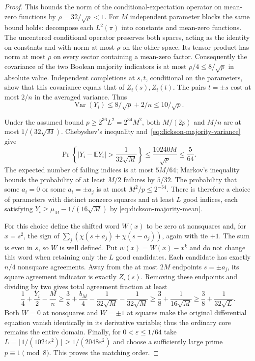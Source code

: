 \begin{proof}
This bounds the norm of the conditional-expectation operator on
mean-zero functions by $\rho=32/\sqrt p<1$.
For $M$ independent parameter blocks the same bound holds:
decompose each $L^2(\pi)$ into constants and mean-zero functions.
The uncentered conditional operator preserves both spaces, acting
as the identity on constants and with norm at most $\rho$ on the
other space.  Its tensor product has norm at most $\rho$ on every
sector containing a mean-zero factor.
Consequently the covariance of the two Boolean majority indicators
is at most $\rho/4\le8/\sqrt p$ in absolute value.
Independent completions at $s,t$, conditional on the parameters,
show that this covariance equals that of $Z_i(s),Z_i(t)$.
The pairs $t=\pm s$ cost at most $2/n$ in the averaged variance.
Thus
\begin{equation}\label{eq:dickson-majority-variance}
 \operatorname{Var}(Y_i)\le8/\sqrt p+2/n\le10/\sqrt p.
\end{equation}

Under the assumed bound $p\ge2^{36}L^2=2^{34}M^2$, both
$M/(2p)$ and $M/n$ are at most $1/(32\sqrt M)$.
Chebyshev's inequality and~\eqref{eq:dickson-majority-variance}
give
\[
 \Pr\left\{|Y_i-\mathbb E Y_i|>\frac1{32\sqrt M}\right\}
 \le\frac{10240M}{\sqrt p}\le\frac5{64}.
\]
The expected number of failing indices is at most $5M/64$;
Markov's inequality bounds the probability of at least $M/2$ failures
by $5/32$.  The probability that some $a_i=0$ or some
$a_i=\pm a_j$ is at most $M^2/p\le2^{-34}$.
There is therefore a choice of parameters with distinct nonzero
squares and at least $L$ good indices, each satisfying
$Y_i\ge\mu_M-1/(16\sqrt M)$ by
\eqref{eq:dickson-majority-mean}.

For this choice define the shifted word $W(x)$ to be zero at
nonsquares and, for $x=s^2$, the sign of
$\sum_j(\chi(s+a_j)+\chi(s-a_j))$, again with tie $+1$.
The sum is even in $s$, so $W$ is well defined.
Put $w(x)=W(x)-x^k$ and do not change this word when retaining
only the $L$ good candidates.
Each candidate has exactly $n/4$ nonsquare agreements.
Away from the at most $2M$ endpoints $s=\pm a_j$, its square
agreement indicator is exactly $Z_i(s)$.
Removing these endpoints and dividing by two gives total agreement
fraction at least
\[
 \frac14+\frac{Y_i}{2}-\frac Mn
 \ge\frac38+\frac{b_M}{4}
             -\frac1{32\sqrt M}-\frac1{32\sqrt M}
 \ge\frac38+\frac1{16\sqrt M}
 \ge\frac38+\frac1{32\sqrt L}.
\]
Both $W=0$ at nonsquares and $W=\pm1$ at squares make the original
differential equation vanish identically in its derivative variable;
thus the ordinary core remains the entire domain.
Finally, for $0<\varepsilon\le1/64$ take
$L=\lfloor1/(1024\varepsilon^2)\rfloor
\ge1/(2048\varepsilon^2)$ and choose a sufficiently large prime
$p\equiv1\pmod8$.  This proves the matching order.
\end{proof}
